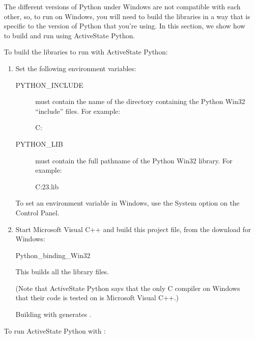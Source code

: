 \documentclass{sbmlmanual}
\begin{document}
The different versions of Python under Windows are not compatible with each
other, so, to run on Windows, you will need to build the \libsbml{} libraries
in a way that is specific to the version of Python that you're using. In this
section, we show how to build and run \libsbml{} using ActiveState Python.

To build the \libsbml{} libraries to run with ActiveState Python:

\begin{enumerate}

\item
Set the following environment variables:

\begin{description}

\item[PYTHON\_INCLUDE] must contain the name of the directory containing the
Python Win32 ``include'' files. For example:

\begin{shellVerbatim}
C:
\end{shellVerbatim}

\item[PYTHON\_LIB] must contain the full pathname of the Python Win32 library.
For example:

\begin{shellVerbatim}
C:\libs\python23.lib
\end{shellVerbatim}

\end{description}

To set an environment variable in Windows, use the System option
on the Control Panel. 


\item
Start Microsoft Visual C++ and build this project file, from the \libsbml{}
download for Windows:

\begin{shellVerbatim}
Python_binding_Win32
\end{shellVerbatim}

This builds all the \libsbml{} library files.

(Note that ActiveState Python says that the only C compiler on Windows that
their code is tested on is Microsoft Visual C++.)

Building with  generates .
\end{enumerate}

To run ActiveState Python with \libsbml{}:
\end{document}
